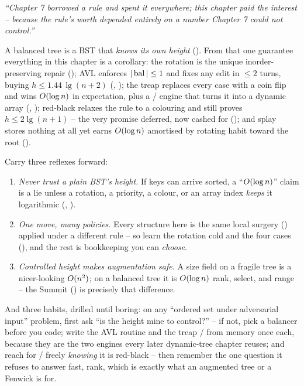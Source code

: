 \begin{lastword}
\emph{``Chapter 7 borrowed a rule and spent it everywhere; this chapter paid the interest -- because the rule's
worth depended entirely on a number Chapter 7 could not control.''}

\medskip
A balanced tree is a BST that \emph{knows its own height} (). From that one
guarantee everything in this chapter is a corollary: the rotation is the unique inorder-preserving repair
(); AVL enforces $|\operatorname{bal}|\le1$ and fixes any edit in $\le2$ turns, buying
$h\le1.44\,\lg(n+2)$ (, ); the treap replaces every case with a coin
flip and wins $O(\log n)$ in expectation, plus a / engine that turns it into a
dynamic array (, ); red-black relaxes the rule to a colouring and
still proves $h\le2\lg(n+1)$ -- the very promise  deferred, now cashed for
 (); and splay stores nothing at all yet earns $O(\log n)$ amortised by
rotating habit toward the root ().

\medskip
Carry three reflexes forward:
\begin{enumerate}[nosep, leftmargin=1.6em]
  \item \emph{Never trust a plain BST's height.} If keys can arrive sorted, a ``$O(\log n)$'' claim is a
        lie unless a rotation, a priority, a colour, or an array index \emph{keeps} it logarithmic
        (, ).
  \item \emph{One move, many policies.} Every structure here is the same local surgery
        () applied under a different rule -- so learn the rotation cold and the four cases
        (), and the rest is bookkeeping you can \emph{choose}.
  \item \emph{Controlled height makes augmentation safe.} A size field on a fragile tree is a nicer-looking
        $O(n^2)$; on a balanced tree it is $O(\log n)$ rank, select, and range -- the Summit
        () is precisely that difference.
\end{enumerate}

\medskip
And three habits, drilled until boring: on any ``ordered set under adversarial input'' problem, first ask
``is the height mine to control?'' -- if not, pick a balancer before you code; write the AVL 
routine and the treap / from memory once each, because they are the two engines every
later dynamic-tree chapter reuses; and reach for / freely \emph{knowing} it is
red-black -- then remember the one question it refuses to answer fast, rank, which is exactly what an
augmented tree or a Fenwick is for.


\end{lastword}

